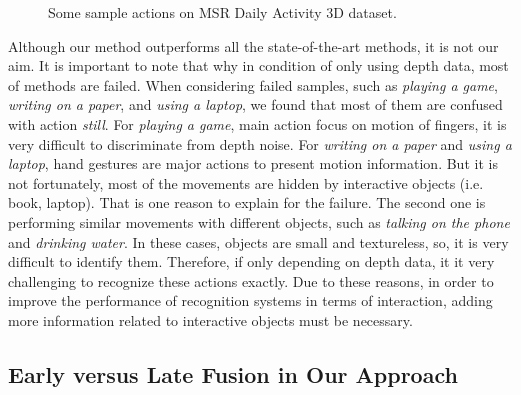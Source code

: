 \documentclass[final,3p,times,twocolumn]{elsarticle}
\begin{document}
\begin{figure}
{        }
    \hfill
	\caption{\label{lbl:Figure_MSRDaily3D}Some sample actions on MSR Daily Activity 3D dataset.}
\end{figure}

Although our method outperforms all the state-of-the-art methods, it is not our aim. It is important to note that why in condition of only using depth data, most of methods are failed. When considering failed samples, such as \textit{playing a game}, \textit{writing on a paper}, and \textit{using a laptop}, we found that most of them are confused with action \textit{still}. For \textit{playing a game}, main action focus on motion of fingers, it is very difficult to discriminate from depth noise. For \textit{writing on a paper} and \textit{using a laptop}, hand gestures are major actions to present motion information. But it is not fortunately, most of the movements are hidden by interactive objects (i.e. book, laptop). That is one reason to explain for the failure. The second one is performing similar movements with different objects, such as \textit{talking on the phone} and \textit{drinking water}. In these cases, objects are small and textureless, so, it is very difficult to identify them.  Therefore, if only depending on depth data, it it very challenging to recognize these actions exactly. Due to these reasons, in order to improve the performance of recognition systems in terms of interaction, adding more information related to interactive objects must be necessary.

\subsection{Early versus Late Fusion in Our Approach}
\end{document}
